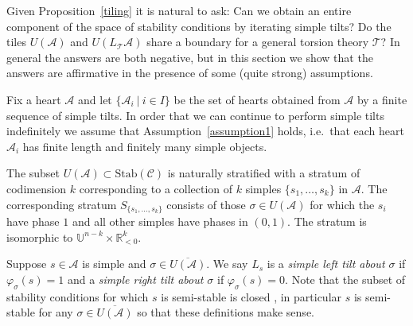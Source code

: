 \documentclass{article}
\theoremstyle{plain}
\theoremstyle{definition}
\theoremstyle{remark}
\newcommand{\defn}[1]{\emph{#1}}
\newcommand{\ie}{i.e.\ }
\newcommand{\R}{\mathbb{R}}
\newcommand{\cat}[1]{\mathcal{#1}}
\newcommand{\stab}[1]{\mathrm{Stab}(#1)}
\begin{document}
Given Proposition~\ref{tiling} it is natural to ask: Can we obtain an entire component of the space of stability conditions by iterating simple tilts? Do the tiles $U(\cat{A})$ and $U(L_\cat{T}\cat{A})$ share a boundary for a general torsion theory $\cat{T}$? In general the answers are both negative, but in this section we show that the answers are affirmative in the presence of some (quite strong) assumptions.

Fix a heart $\cat{A}$ and let $\{\cat{A}_i \ | \ i\in I\}$ be the set of hearts obtained from $\cat{A}$ by a finite sequence of simple tilts. In order that we can continue to perform simple tilts indefinitely we assume that Assumption~\ref{assumption1} holds, \ie that each heart $\cat{A}_i$ has finite length and finitely many simple objects. 

The subset $U(\cat{A}) \subset \stab{\cat{C}}$ is naturally stratified with a stratum of codimension $k$ corresponding to a collection of $k$ simples $\{s_1,\ldots,s_k\}$ in $\cat{A}$. The corresponding stratum $S_{\{s_1,\ldots,s_k\}}$ consists of those $\sigma \in U(\cat{A})$ for which the $s_i$ have phase $1$ and all other simples have phases in $(0,1)$. The stratum is  isomorphic to $\mathbb{U}^{n-k}\times \R_{<0}^k$.

Suppose $s\in \cat{A}$ is simple and $\sigma\in \overline{U(\cat{A})}$. We say $L_s$ is a \defn{simple left tilt about $\sigma$} if $\varphi_\sigma(s)=1$ and a \defn{simple right tilt about $\sigma$} if $\varphi_\sigma(s)=0$. Note that the subset of stability conditions for which $s$ is semi-stable is closed \cite[Proposition 8.1]{MR2373143}, in particular $s$ is semi-stable for any $\sigma\in\overline{U(\cat{A})}$ so that these definitions make sense. 
\end{document}

